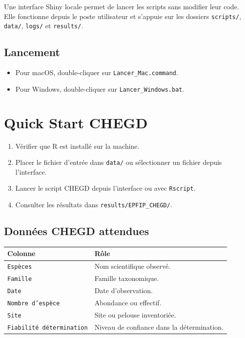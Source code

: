\documentclass[11pt,a4paper]{article}
\begin{document}
Une interface Shiny locale permet de lancer les scripts sans modifier leur code. Elle
fonctionne depuis le poste utilisateur et s'appuie sur les dossiers \texttt{scripts/},
\texttt{data/}, \texttt{logs/} et \texttt{results/}.

\subsection{Lancement}

\begin{itemize}
  \item Pour macOS, double-cliquer sur \texttt{Lancer\_Mac.command}.
  \item Pour Windows, double-cliquer sur \texttt{Lancer\_Windows.bat}.
\end{itemize}

\section{Quick Start CHEGD}

\begin{enumerate}
  \item Vérifier que R est installé sur la machine.
  \item Placer le fichier d'entrée dans \texttt{data/} ou sélectionner un fichier depuis l'interface.
  \item Lancer le script CHEGD depuis l'interface ou avec \texttt{Rscript}.
  \item Consulter les résultats dans \texttt{results/EPFIP\_CHEGD/}.
\end{enumerate}

\subsection{Données CHEGD attendues}

\begin{tabularx}{\textwidth}{lX}
\toprule
\textbf{Colonne} & \textbf{Rôle} \\
\midrule
\texttt{Espèces} & Nom scientifique observé. \\
\texttt{Famille} & Famille taxonomique. \\
\texttt{Date} & Date d'observation. \\
\texttt{Nombre d'espèce} & Abondance ou effectif. \\
\texttt{Site} & Site ou pelouse inventoriée. \\
\texttt{Fiabilité détermination} & Niveau de confiance dans la détermination. \\
\bottomrule
\end{tabularx}
\end{document}
